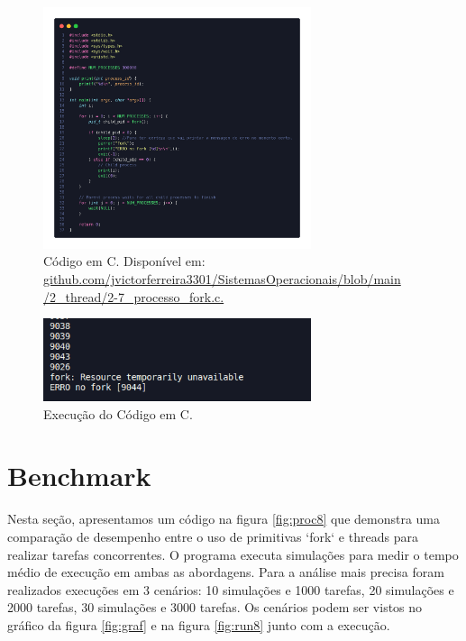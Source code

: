 \documentclass[
	12pt,				%
	openright,			%
	oneside,			%
	a4paper,			%
	chapter=TITLE,		%
	english,			%
	french,				%
	spanish,			%
	brazil				%
	]{abntex2}
\theoremstyle{definition}
\begin{document}
\begin{figure}[H]
    \centering
    \includegraphics[width=0.7\textwidth]{imagens/processos_7_2.png}
    \caption{Código em C. Disponível em: \href{https://github.com/jvictorferreira3301/Sistemas_Operacionais/blob/main/2_thread/2-7_processo_fork.c}{github.com/jvictorferreira3301/SistemasOperacionais/blob/main
    /2\_thread/2-7\_processo\_fork.c.}}
    \label{fig:proc7_2}
\end{figure}

\begin{figure}[H]
    \centering
    \includegraphics[width=0.7\textwidth]{imagens/run_processos_7_2.png}
    \caption{Execução do Código em C.}
    \label{fig:run_proc7_2}
\end{figure}

\section{Benchmark}

Nesta seção, apresentamos um código na figura \ref{fig:proc8} que demonstra uma comparação 
de desempenho entre o uso de primitivas `fork` e threads para realizar tarefas 
concorrentes. O programa executa simulações para medir o tempo médio de 
execução em ambas as abordagens. Para a análise mais precisa foram realizados
execuções em 3 cenários: 10 simulações e 1000 tarefas, 20 simulações e 2000 tarefas,
30 simulações e 3000 tarefas. Os cenários podem ser vistos no gráfico da figura \ref{fig:graf}
e na figura \ref{fig:run8} junto com a execução.
\end{document}
